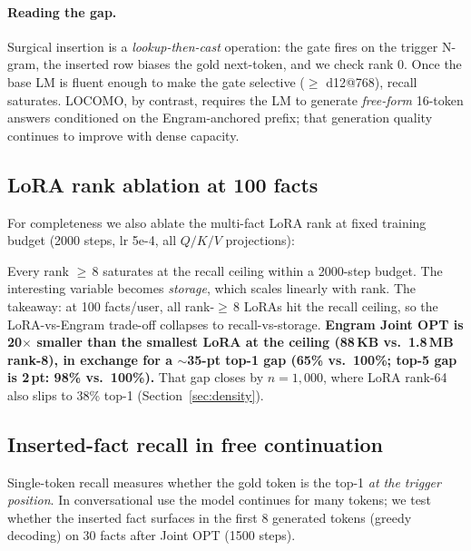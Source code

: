 \documentclass[letterpaper]{article} %
\begin{document}
\paragraph{Reading the gap.} Surgical insertion is a
\emph{lookup-then-cast} operation: the gate fires on the trigger
N-gram, the inserted row biases the gold next-token, and we
check rank 0. Once the base LM is fluent enough to make the gate
selective (${\geq}$ d12@768), recall saturates. LOCOMO, by
contrast, requires the LM to generate \emph{free-form} 16-token
answers conditioned on the Engram-anchored prefix; that
generation quality continues to improve with dense capacity.

\subsection{LoRA rank ablation at 100 facts}
\label{sec:lora-rank}

For completeness we also ablate the multi-fact LoRA rank at fixed
training budget (2000 steps, lr 5e-4, all $Q/K/V$ projections):


Every rank ${\geq}\,8$ saturates at the recall ceiling within a
2000-step budget. The interesting variable becomes
\emph{storage}, which scales linearly with rank. The takeaway:
at 100 facts/user, all rank-${\geq}\,8$ LoRAs hit the recall
ceiling, so the LoRA-vs-Engram trade-off collapses to
recall-vs-storage. \textbf{Engram Joint OPT is 20$\times$
smaller than the smallest LoRA at the ceiling (88\,KB vs.\
1.8\,MB rank-8), in exchange for a $\sim$35-pt top-1 gap
(65\% vs.\ 100\%; top-5 gap is 2\,pt: 98\% vs.\ 100\%).}
That gap closes by $n{=}1{,}000$, where LoRA rank-64 also slips
to 38\% top-1 (Section~\ref{sec:density}).

\subsection{Inserted-fact recall in free continuation}

Single-token recall measures whether the gold token is the
top-1 \emph{at the trigger position}. In conversational use the
model continues for many tokens; we test whether the inserted fact
surfaces in the first 8 generated tokens (greedy decoding) on
30 facts after Joint OPT (1500 steps).

\end{document}
